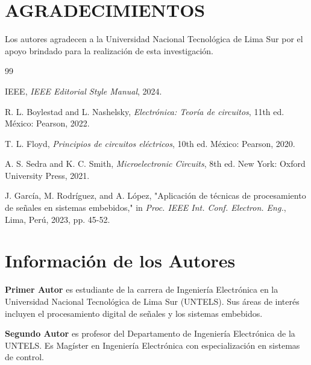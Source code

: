 \documentclass[conference, letterpaper, 10pt]{IEEEtran}
\begin{document}
\section{AGRADECIMIENTOS}

Los autores agradecen a la Universidad Nacional Tecnológica de Lima Sur por el apoyo brindado para la realización de esta investigación.


% 
% 


\begin{thebibliography}{99}

    IEEE, \textit{IEEE Editorial Style Manual}, 2024.

    R. L. Boylestad and L. Nashelsky, \textit{Electrónica: Teoría de circuitos}, 11th ed. México: Pearson, 2022.

    T. L. Floyd, \textit{Principios de circuitos eléctricos}, 10th ed. México: Pearson, 2020.

    A. S. Sedra and K. C. Smith, \textit{Microelectronic Circuits}, 8th ed. New York: Oxford University Press, 2021.

    J. García, M. Rodríguez, and A. López, "Aplicación de técnicas de procesamiento de señales en sistemas embebidos," in \textit{Proc. IEEE Int. Conf. Electron. Eng.}, Lima, Perú, 2023, pp. 45-52.

\end{thebibliography}

\newpage
\section*{Información de los Autores}

\textbf{Primer Autor} es estudiante de la carrera de Ingeniería Electrónica en la Universidad Nacional Tecnológica de Lima Sur (UNTELS). Sus áreas de interés incluyen el procesamiento digital de señales y los sistemas embebidos.

\textbf{Segundo Autor} es profesor del Departamento de Ingeniería Electrónica de la UNTELS. Es Magíster en Ingeniería Electrónica con especialización en sistemas de control.
\end{document}
